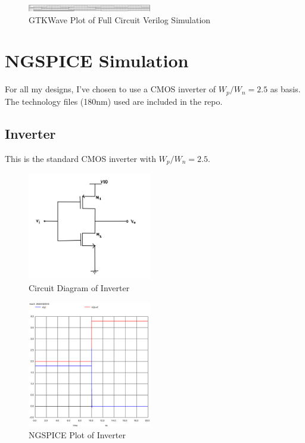 \documentclass[conference]{IEEEtran}
\begin{document}
\begin{figure}[hb]
    \centering
    \includegraphics[width=0.48\textwidth]{images/verilog_full.png}
    \caption{GTKWave Plot of Full Circuit Verilog Simulation}
\end{figure}

\section{NGSPICE Simulation}

For all my designs, I've chosen to use a CMOS inverter of $W_p/W_n = 2.5$ as basis. The technology files (180nm) used are included in the repo. \cite{b2}

\subsection{Inverter}

This is the standard CMOS inverter with $W_p/W_n = 2.5$.

\begin{figure}[H]
    \centering
    \includegraphics[width=0.48\textwidth]{images/inv_cmos_circuit_diagram.png}
    \caption{Circuit Diagram of Inverter}
\end{figure}

\begin{figure}[H]
    \centering
    \includegraphics[width=0.48\textwidth]{images/inv_cmos_tran.eps}
    \caption{NGSPICE Plot of Inverter}
\end{figure}
\end{document}
